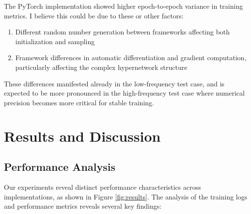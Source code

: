 \documentclass[10pt,journal,compsoc,onecolumn]{IEEEtran}
\begin{document}
The PyTorch implementation showed higher epoch-to-epoch variance in training metrics. I believe this could be due to these or other factors:
\begin{enumerate}
    \item Different random number generation between frameworks affecting both initialization and sampling
    \item Framework differences in automatic differentiation and gradient computation, particularly affecting the complex hypernetwork structure
\end{enumerate}

These differences manifested already in the low-frequency test case, and is expected to be more pronounced in the high-frequency test case where numerical precision becomes more critical for stable training.

\section{Results and Discussion}
\subsection{Performance Analysis}
Our experiments reveal distinct performance characteristics across implementations, as shown in Figure \ref{fig:results}. The analysis of the training logs and performance metrics reveals several key findings:
\end{document}
